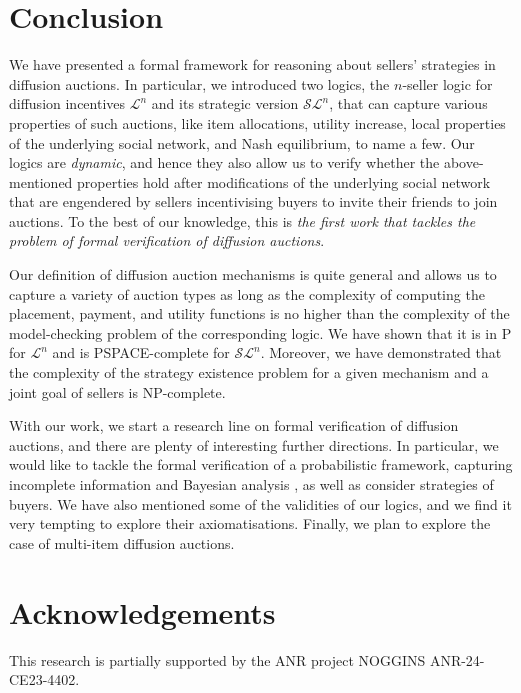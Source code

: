 \documentclass[letterpaper]{article} %
\theoremstyle{definition}
\begin{document}
\section{Conclusion}
We have presented a formal framework for reasoning about sellers' strategies in diffusion auctions. In particular, we introduced two logics, the $n$-seller logic for diffusion incentives $\mathcal{L}^n$ and its strategic version $\mathcal{SL}^n$, that can capture various properties of such auctions, like item allocations, utility increase, local properties of the underlying social network, and Nash equilibrium, to name a few. Our logics are \textit{dynamic}, and hence they also allow us to verify whether the above-mentioned properties hold after modifications of the underlying social network that are engendered by sellers incentivising buyers to invite their friends to join auctions. To the best of our knowledge, this is \textit{the first work that tackles the problem of formal verification of diffusion auctions}.  

Our definition of diffusion auction mechanisms is quite general and allows us to capture a variety of auction types as long as the complexity of computing the placement, payment, and utility functions is no higher than the complexity of the model-checking problem of the corresponding logic. %
We have shown that it is in P for $\mathcal{L}^n$ and is PSPACE-complete for $\mathcal{SL}^n$. Moreover, we have demonstrated that the complexity of the strategy existence problem for a given mechanism and a joint goal of sellers is NP-complete.   

With our work, we start a research line on formal verification of diffusion auctions, and there are plenty of interesting further directions. %
In particular, we would like to tackle the formal verification of 
a probabilistic framework, capturing incomplete information and Bayesian analysis
\cite{huang2025approximate}, as well as consider strategies of buyers. We have also mentioned some of the validities of our logics, and we find it very tempting to explore their axiomatisations. Finally, we plan to explore the case of multi-item diffusion auctions.

\section*{Acknowledgements}
This research is partially supported by the ANR project NOGGINS ANR-24-CE23-4402.



%
\end{document}
